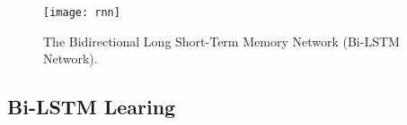 %
%






\begin{figure}[!b]
	\centering
	\texttt{[image: rnn]}
	\caption{The Bidirectional Long Short-Term Memory Network (Bi-LSTM Network).}
	\label{fig:rnn}
\end{figure}


\subsection{Bi-LSTM Learing}\label{sec:LSTM}

